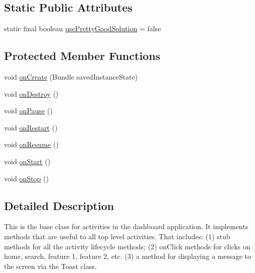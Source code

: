 \subsection*{Static Public Attributes}
\begin{DoxyCompactItemize}
\item 
static final boolean \hyperlink{classcom_1_1zia_1_1freshdocs_1_1activity_1_1_dashboard_activity_a4f0c42391a05231663066c1281d25806}{use\-Pretty\-Good\-Solution} = false
\end{DoxyCompactItemize}
\subsection*{Protected Member Functions}
\begin{DoxyCompactItemize}
\item 
void \hyperlink{classcom_1_1zia_1_1freshdocs_1_1activity_1_1_dashboard_activity_a8a3ea677f93836e914cdf5f575564d9f}{on\-Create} (Bundle saved\-Instance\-State)
\item 
void \hyperlink{classcom_1_1zia_1_1freshdocs_1_1activity_1_1_dashboard_activity_acbec79e811dbab673f18ec6167c19e8b}{on\-Destroy} ()
\item 
void \hyperlink{classcom_1_1zia_1_1freshdocs_1_1activity_1_1_dashboard_activity_a1c5709add71b9c1d5aeaeadd597b00c5}{on\-Pause} ()
\item 
void \hyperlink{classcom_1_1zia_1_1freshdocs_1_1activity_1_1_dashboard_activity_a09ccc65398e848864bd7bd01b9480965}{on\-Restart} ()
\item 
void \hyperlink{classcom_1_1zia_1_1freshdocs_1_1activity_1_1_dashboard_activity_af1c350de1a894e0102f8a378294ee839}{on\-Resume} ()
\item 
void \hyperlink{classcom_1_1zia_1_1freshdocs_1_1activity_1_1_dashboard_activity_a48a4a1898378015913a088a24011faaa}{on\-Start} ()
\item 
void \hyperlink{classcom_1_1zia_1_1freshdocs_1_1activity_1_1_dashboard_activity_a995023ad63161e159cabffbd788d302e}{on\-Stop} ()
\end{DoxyCompactItemize}


\subsection{Detailed Description}
This is the base class for activities in the dashboard application. It implements methods that are useful to all top level activities. That includes\-: (1) stub methods for all the activity lifecycle methods; (2) on\-Click methods for clicks on home, search, feature 1, feature 2, etc. (3) a method for displaying a message to the screen via the Toast class. 

